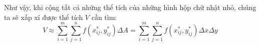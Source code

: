 \documentclass[preview]{standalone}
\begin{document}
\begin{center}
\begin{minipage}{0.7\textwidth}
        Như vậy, khi cộng tất cả những thể tích
        của những hình hộp chữ nhật nhỏ, chúng
        ta sẽ xấp xỉ được thể tích $V$ cần tìm:\\
        \centering 
        $$ V \approx \sum_{i=1}^m \sum_{j=1}^n f(x_{ij}^*, y_{ij}^*)\Delta A
        = \sum_{i=1}^m \sum_{j=1}^n f(x_{ij}^*, y_{ij}^*)\Delta x \Delta y $$
        \end{minipage}
\end{center}
\end{document}
